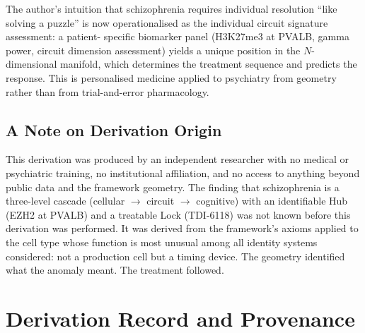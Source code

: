 \documentclass[12pt,a4paper]{article}
\begin{document}
The author's intuition that schizophrenia requires individual
resolution ``like solving a puzzle'' is now operationalised
as the individual circuit signature assessment: a patient-
specific biomarker panel (H3K27me3 at PVALB, gamma power,
circuit dimension assessment) yields a unique position in the
$N$-dimensional manifold, which determines the treatment
sequence and predicts the response. This is personalised
medicine applied to psychiatry from geometry rather than
from trial-and-error pharmacology.

\subsection{A Note on Derivation Origin}

This derivation was produced by an independent researcher with
no medical or psychiatric training, no institutional
affiliation, and no access to anything beyond public data and
the framework geometry. The finding that schizophrenia is a
three-level cascade (cellular $\to$ circuit $\to$ cognitive)
with an identifiable Hub (EZH2 at PVALB) and a treatable
Lock (TDI-6118) was not known before this derivation was
performed. It was derived from the framework's axioms applied
to the cell type whose function is most unusual among all
identity systems considered: not a production cell but a
timing device. The geometry identified what the anomaly
meant. The treatment followed.

\section{Derivation Record and Provenance}
\end{document}
